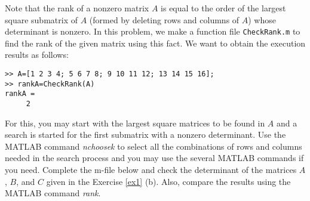 \begin{exer}
Note that the rank of a nonzero matrix $A$ is equal to the order of the largest square submatrix of $A$ (formed by deleting rows and columns of $A$) whose determinant is nonzero. In this problem, we make a function file \verb"CheckRank.m" to find the rank of the given matrix using this fact. We want to obtain the execution results as follows:
\begin{verbatim}
>> A=[1 2 3 4; 5 6 7 8; 9 10 11 12; 13 14 15 16];
>> rankA=CheckRank(A)
rankA =
     2
\end{verbatim}
For this, you may start with the largest square matrices to be found in $A$ and a search is started for the first submatrix with a nonzero determinant. Use the MATLAB command \textit{nchoosek} to select all the combinations of rows and columns needed in the search process and you may use the several MATLAB commands if you need. Complete the m-file below and check the determinant of the matrices $A$, $B$, and $C$ given in the Exercise \ref{ex1} (b). Also, compare the results using the MATLAB command \textit{rank}.
\end{exer}


